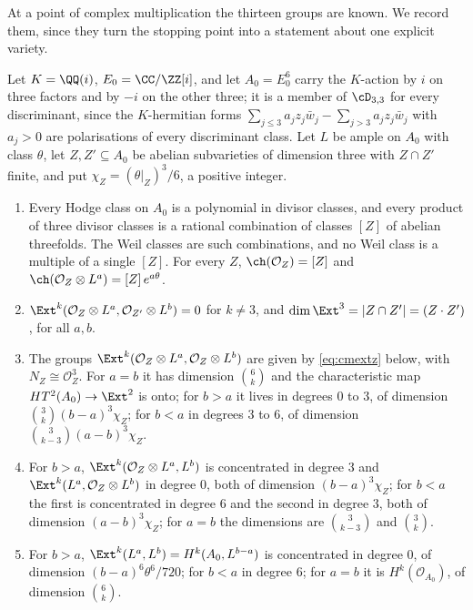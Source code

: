 At a point of complex multiplication the thirteen groups are known. We record them, since they turn the stopping point into a statement about one explicit variety.

\begin{lemma}\label{lem:cmext}
Let $K=\QQ(i)$, $E_{0}=\CC/\ZZ[i]$, and let $A_{0}=E_{0}^{6}$ carry the $K$-action by $i$ on three factors and by $-i$ on the other three; it is a member of $\cD_{3,3}$ for every discriminant, since the $K$-hermitian forms $\sum_{j\le3}a_{j}z_{j}\bar w_{j}-\sum_{j>3}a_{j}z_{j}\bar w_{j}$ with $a_{j}>0$ are polarisations of every discriminant class. Let $L$ be ample on $A_{0}$ with class $\theta$, let $Z,Z'\subseteq A_{0}$ be abelian subvarieties of dimension three with $Z\cap Z'$ finite, and put $\chi_{Z}=(\theta|_{Z})^{3}/6$, a positive integer.
\begin{enumerate}[label=\textup{(\roman*)},leftmargin=2.4em,itemsep=2pt]
\item Every Hodge class on $A_{0}$ is a polynomial in divisor classes, and every product of three divisor classes is a rational combination of classes $[Z]$ of abelian threefolds. The Weil classes are such combinations, and no Weil class is a multiple of a single $[Z]$. For every $Z$, $\ch(\mathcal{O}_{Z})=[Z]$ and $\ch(\mathcal{O}_{Z}\otimes L^{a})=[Z]\,e^{a\theta}$.
\item $\Ext^{k}(\mathcal{O}_{Z}\otimes L^{a},\mathcal{O}_{Z'}\otimes L^{b})=0$ for $k\ne3$, and $\dim\Ext^{3}=|Z\cap Z'|=(Z\cdot Z')$, for all $a,b$.
\item The groups $\Ext^{k}(\mathcal{O}_{Z}\otimes L^{a},\mathcal{O}_{Z}\otimes L^{b})$ are given by \eqref{eq:cmextz} below, with $N_{Z}\cong\mathcal{O}_{Z}^{3}$. For $a=b$ it has dimension $\binom{6}{k}$ and the characteristic map $HT^{2}(A_{0})\to\Ext^{2}$ is onto; for $b>a$ it lives in degrees $0$ to $3$, of dimension $\binom{3}{k}(b-a)^{3}\chi_{Z}$; for $b<a$ in degrees $3$ to $6$, of dimension $\binom{3}{k-3}(a-b)^{3}\chi_{Z}$.
\item For $b>a$, $\Ext^{k}(\mathcal{O}_{Z}\otimes L^{a},L^{b})$ is concentrated in degree $3$ and $\Ext^{k}(L^{a},\mathcal{O}_{Z}\otimes L^{b})$ in degree $0$, both of dimension $(b-a)^{3}\chi_{Z}$; for $b<a$ the first is concentrated in degree $6$ and the second in degree $3$, both of dimension $(a-b)^{3}\chi_{Z}$; for $a=b$ the dimensions are $\binom{3}{k-3}$ and $\binom{3}{k}$.
\item For $b>a$, $\Ext^{k}(L^{a},L^{b})=H^{k}(A_{0},L^{b-a})$ is concentrated in degree $0$, of dimension $(b-a)^{6}\theta^{6}/720$; for $b<a$ in degree $6$; for $a=b$ it is $H^{k}(\mathcal{O}_{A_{0}})$, of dimension $\binom{6}{k}$.
\end{enumerate}
\end{lemma}


